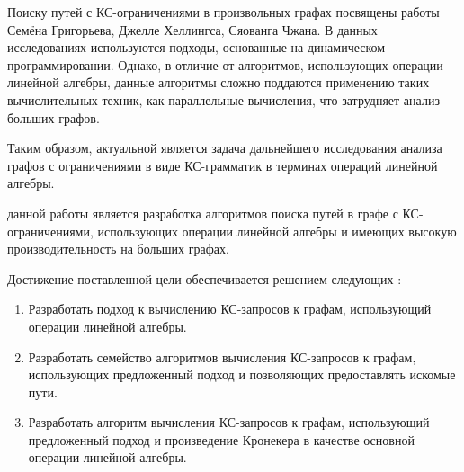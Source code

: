 Поиску путей с КС-ограничениями в произвольных графах посвящены работы Семёна Григорьева, Джелле Хеллингса, Сяованга Чжана. В данных исследованиях используются подходы, основанные на динамическом программировании. Однако, в отличие от алгоритмов, использующих операции линейной алгебры, данные алгоритмы сложно поддаются применению таких вычислительных техник, как параллельные вычисления, что затрудняет анализ больших графов.

Таким образом, актуальной является задача дальнейшего исследования анализа графов с ограничениями в виде КС-грамматик в терминах операций линейной алгебры.

{\aim} данной работы является разработка алгоритмов поиска путей в графе с КС-ограничениями, использующих операции линейной алгебры и имеющих высокую производительность на больших графах.

Достижение поставленной цели обеспечивается решением следующих {\tasks}:
\begin{enumerate}[beginpenalty=10000] %
  \item Разработать подход к вычислению КС-запросов к графам, использующий операции линейной алгебры.
  \item Разработать семейство алгоритмов вычисления КС-запросов к графам, использующих предложенный подход и позволяющих предоставлять искомые пути.
  \item Разработать алгоритм вычисления КС-запросов к графам, использующий предложенный подход и произведение Кронекера в качестве основной операции линейной алгебры.
\end{enumerate}


